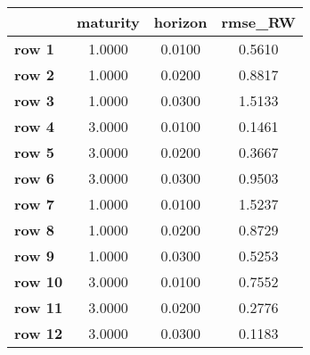 \begin{tiny}\begin{tabular}{|l|c|c|c|}
\hline
&\textbf{maturity}&\textbf{horizon}&\textbf{rmse_RW}\\\hline
\textbf{row 1}&1.0000&0.0100&0.5610\\\hline
\textbf{row 2}&1.0000&0.0200&0.8817\\\hline
\textbf{row 3}&1.0000&0.0300&1.5133\\\hline
\textbf{row 4}&3.0000&0.0100&0.1461\\\hline
\textbf{row 5}&3.0000&0.0200&0.3667\\\hline
\textbf{row 6}&3.0000&0.0300&0.9503\\\hline
\textbf{row 7}&1.0000&0.0100&1.5237\\\hline
\textbf{row 8}&1.0000&0.0200&0.8729\\\hline
\textbf{row 9}&1.0000&0.0300&0.5253\\\hline
\textbf{row 10}&3.0000&0.0100&0.7552\\\hline
\textbf{row 11}&3.0000&0.0200&0.2776\\\hline
\textbf{row 12}&3.0000&0.0300&0.1183\\\hline
\end{tabular}
\end{tiny}